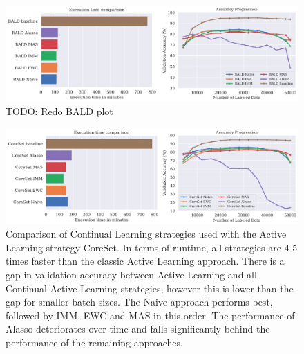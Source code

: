 \begin{figure} [ht]
    \centering
    \includegraphics[width=\linewidth]{images/results_CAL/Bald_CAL_4000b.png}
    \caption[Continual Active Learning BALD 4000 batch size]{TODO: Redo BALD plot}
    \label{fig:Evaluation:Results:CAL:BALD4000}
\end{figure}

\begin{figure} [ht]
    \centering
    \includegraphics[width=\linewidth]{images/results_CAL/CoreSet_CAL_4000b.png}
    \caption[Continual Active Learning CoreSet 4000 batch size]{Comparison of Continual Learning strategies used with the Active Learning strategy CoreSet. In terms of runtime, all
    strategies are 4-5 times faster than the classic Active Learning approach. There is a gap in validation accuracy between Active Learning and all Continual
    Active Learning strategies, however this is lower than the gap for smaller batch sizes. The Naive approach performs best, followed by IMM, EWC and MAS in this order. The performance
    of Alasso deteriorates over time and falls significantly behind the performance of the remaining approaches.}
    \label{fig:Evaluation:Results:CAL:CoreSet4000}
\end{figure}

